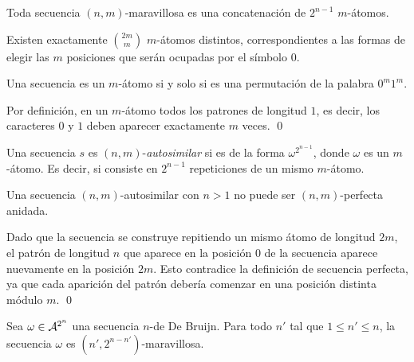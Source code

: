 \documentclass[11pt]{article}
\begin{document}
\begin{obs}
	Toda secuencia $(n,m)$-maravillosa es una concatenación de $2^{n-1}$
	$m$-átomos.
\end{obs}

\begin{prop}
	Existen exactamente $\binom{2m}{m}$ $m$-átomos distintos, correspondientes a
	las formas de elegir las $m$ posiciones que serán ocupadas por el símbolo
	$0$.
\end{prop}

\begin{demo}
	Una secuencia es un $m$-átomo si y solo si es una permutación de la palabra
	$0^m1^m$.

	Por definición, en un $m$-átomo todos los patrones de longitud $1$, es
	decir, los caracteres $0$ y $1$ deben aparecer exactamente $m$ veces. \qed
\end{demo}


\begin{defi}
	Una secuencia $s$ es $(n,m)$-\emph{autosimilar} si es de la forma
	$\omega^{2^{n-1}}$, donde $\omega$ es un $m$-átomo. Es decir, si consiste
	en $2^{n-1}$ repeticiones de un mismo $m$-átomo.
\end{defi}

\begin{obs}
	\label{lema:autosimilar-cannot-be-np}
	Una secuencia $(n,m)$-autosimilar con $n > 1$ no puede ser $(n,m)$-perfecta
	anidada.
\end{obs}

\begin{demo}
	Dado que la secuencia se construye repitiendo %
	un mismo
	átomo de longitud $2m$, el patrón de longitud $n$ que aparece en la posición
	$0$ de la secuencia aparece nuevamente en la posición $2m$. Esto contradice
	la definición de secuencia perfecta, ya que cada aparición del patrón debería
	comenzar en una posición distinta módulo $m$. \qed
\end{demo}

\begin{lema}
	Sea $\omega \in \mathcal{A}^{2^n}$ una secuencia $n$-de De Bruijn. Para todo
	$n'$ tal que $1 \leq n' \leq n$, la secuencia $\omega$ es
	$(n',2^{n-n'})$-maravillosa.
\end{lema}
\end{document}
